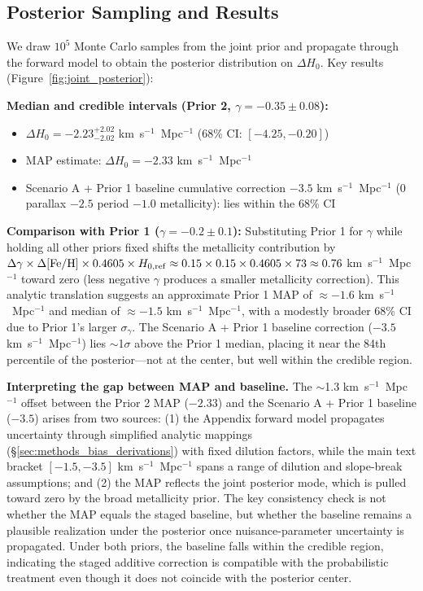 \documentclass[preprint, linenumbers]{aastex701}
\begin{document}
\subsection{Posterior Sampling and Results}

We draw $10^5$ Monte Carlo samples from the joint prior and propagate through the forward model to obtain the posterior distribution on $\Delta H_0$. Key results (Figure~\ref{fig:joint_posterior}):

\textbf{Median and credible intervals (Prior 2, $\gamma = -0.35 \pm 0.08$):}
\begin{itemize}
\item $\Delta H_0 = -2.23^{+2.02}_{-2.02}$ km~s$^{-1}$~Mpc$^{-1}$ (68\% CI: $[-4.25, -0.20]$)
\item MAP estimate: $\Delta H_0 = -2.33$ km~s$^{-1}$~Mpc$^{-1}$
\item Scenario A + Prior 1 baseline cumulative correction $-3.5$ km~s$^{-1}$~Mpc$^{-1}$ (0 parallax $-2.5$ period $-1.0$ metallicity): lies within the 68\% CI
\end{itemize}

\textbf{Comparison with Prior 1 ($\gamma = -0.2 \pm 0.1$):} Substituting Prior 1 for $\gamma$ while holding all other priors fixed shifts the metallicity contribution by $\Delta\gamma \times \Delta{\rm [Fe/H]} \times 0.4605 \times H_{0,\rm ref} \approx 0.15 \times 0.15 \times 0.4605 \times 73 \approx 0.76$ km~s$^{-1}$~Mpc$^{-1}$ toward zero (less negative $\gamma$ produces a smaller metallicity correction). This analytic translation suggests an approximate Prior 1 MAP of $\approx -1.6$ km~s$^{-1}$~Mpc$^{-1}$ and median of $\approx -1.5$ km~s$^{-1}$~Mpc$^{-1}$, with a modestly broader 68\% CI due to Prior 1's larger $\sigma_\gamma$. The Scenario A + Prior 1 baseline correction ($-3.5$ km~s$^{-1}$~Mpc$^{-1}$) lies $\sim$1$\sigma$ above the Prior 1 median, placing it near the 84th percentile of the posterior---not at the center, but well within the credible region.

\textbf{Interpreting the gap between MAP and baseline.} The $\sim$1.3 km~s$^{-1}$~Mpc$^{-1}$ offset between the Prior 2 MAP ($-2.33$) and the Scenario A + Prior 1 baseline ($-3.5$) arises from two sources: (1) the Appendix forward model propagates uncertainty through simplified analytic mappings (\S\ref{sec:methods_bias_derivations}) with fixed dilution factors, while the main text bracket $[-1.5, -3.5]$ km~s$^{-1}$~Mpc$^{-1}$ spans a range of dilution and slope-break assumptions; and (2) the MAP reflects the joint posterior mode, which is pulled toward zero by the broad metallicity prior. The key consistency check is not whether the MAP equals the staged baseline, but whether the baseline remains a plausible realization under the posterior once nuisance-parameter uncertainty is propagated. Under both priors, the baseline falls within the credible region, indicating the staged additive correction is compatible with the probabilistic treatment even though it does not coincide with the posterior center.
\end{document}
